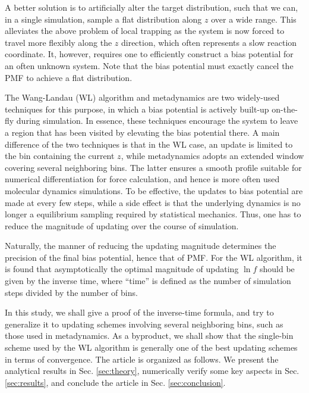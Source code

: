 \documentclass[reprint]{revtex4-1}
\begin{document}
A better solution is to artificially alter
the target distribution,
such that we can, in a single simulation, sample
a flat distribution\cite{mezei1987, berg1992, lee1993,
wang2001, wang2001pre, laio2002}
along $z$ over a wide range.
%
This alleviates the above problem of local trapping
as the system is now forced to travel more flexibly
along the $z$ direction,
which often represents a slow reaction coordinate.
%
It, however, requires one to efficiently construct a
bias potential for an often unknown system.
%
Note that the bias potential must exactly cancel the PMF
to achieve a flat distribution.



The Wang-Landau (WL) algorithm\cite{wang2001, wang2001pre}
and metadynamics\cite{laio2002, laio2008, barducci2011, sutto2012}
are two widely-used techniques for this purpose,
in which a bias potential is actively built-up on-the-fly
during simulation.
%
In essence, these techniques
encourage the system to leave a region that has been visited
by elevating the bias potential there.
%
A main difference of the two techniques
is that in the WL case, an update is limited to the bin
containing the current $z$,
while metadynamics adopts an extended window
covering several neighboring bins.
%
The latter ensures a smooth profile
suitable for numerical differentiation for force calculation,
and hence is more often used molecular dynamics simulations.
%
To be effective, the updates to bias potential
are made at every few steps,
while a side effect is that the underlying dynamics
is no longer a equilibrium sampling
required by statistical mechanics.
%
Thus, one has to reduce the magnitude of updating
over the course of simulation.



Naturally, the manner of reducing
the updating magnitude\cite{liang2007,
belardinelli2007, belardinelli2007jcp, belardinelli2008,
morozov2007, zhou2008, morozov2009,
komura2012, caparica2012, caparica2014,
barducci2008, dickson2011, dama2014, dickson2015}
determines the precision of the final bias potential,
hence that of PMF.
%
For the WL algorithm, it is found
that asymptotically the optimal magnitude of updating $\ln f$
should be given by the
inverse time\cite{liang2007,
belardinelli2007, belardinelli2007jcp, belardinelli2008,
morozov2007, zhou2008},
where ``time'' is defined as
the number of simulation steps
divided by the number of bins.


In this study,
we shall give a proof of the inverse-time formula,
and try to generalize it to
updating schemes involving several neighboring bins,
such as those used in metadynamics.
%
As a byproduct, we shall show that
the single-bin scheme used by the WL algorithm
is generally one of the best
updating schemes in terms of convergence.
%
The article is organized as follows.
%
We present the analytical results in Sec. \ref{sec:theory},
numerically verify some key aspects
in Sec. \ref{sec:results},
and conclude the article
in Sec. \ref{sec:conclusion}.
\end{document}
